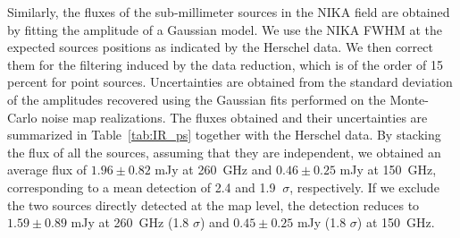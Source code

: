 \documentclass[twocolumn,traditabstract]{aa}
\begin{document}
Similarly, the fluxes of the sub-millimeter sources in the NIKA field are obtained by fitting the amplitude of a Gaussian model. We use the NIKA FWHM at the expected sources positions as indicated by the Herschel data. We then correct them for the filtering induced by the data reduction, which is of the order of 15 percent for point sources. Uncertainties are obtained from the standard deviation of the amplitudes recovered using the Gaussian fits performed on the Monte-Carlo noise map realizations. The fluxes obtained and their uncertainties are summarized in Table~\ref{tab:IR_ps} together with the Herschel data. By stacking the flux of all the sources, assuming that they are independent, we obtained an average flux of $1.96 \pm 0.82$ mJy at 260~GHz and $0.46 \pm 0.25$ mJy at 150~GHz, corresponding to a mean detection of 2.4 and 1.9 $ \ \sigma$, respectively. If we exclude the two sources directly detected at the map level, the detection reduces to $1.59 \pm 0.89$ mJy at 260~GHz (1.8 $\sigma$) and $0.45 \pm 0.25$ mJy (1.8 $\sigma$) at 150~GHz.
\end{document}
